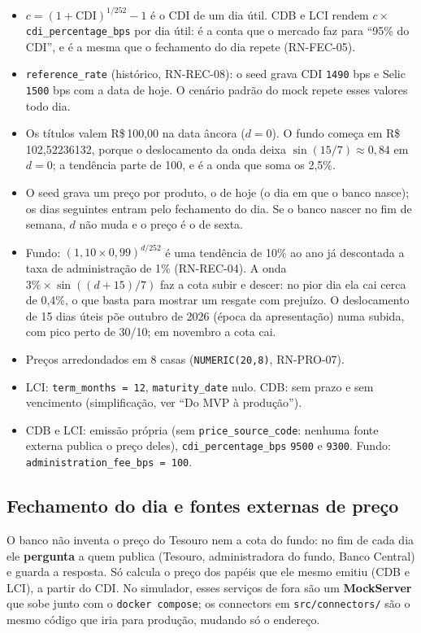 \documentclass[11pt,a4paper]{article}
\newcommand{\rs}{R\$\,}
\newcommand{\tb}[1]{\texttt{#1}}           %
\begin{document}
\begin{itemize}
  \item $c = (1 + \text{CDI})^{1/252} - 1$ é o CDI de um dia útil. CDB e LCI rendem
        $c \times$ \tb{cdi_percentage_bps} por dia útil: é a conta que o mercado faz para
        ``95\% do CDI'', e é a mesma que o fechamento do dia repete (RN-FEC-05).
  \item \tb{reference_rate} (histórico, RN-REC-08): o seed grava CDI \tb{1490} bps e Selic
        \tb{1500} bps com a data de hoje. O cenário padrão do mock repete esses valores todo dia.
  \item Os títulos valem \rs 100,00 na data âncora ($d = 0$). O fundo começa em
        \rs 102,52236132, porque o deslocamento da onda deixa $\sin(15/7) \approx 0{,}84$ em $d = 0$;
        a tendência parte de 100, e é a onda que soma os 2,5\%.
  \item O seed grava um preço por produto, o de hoje (o dia em que o banco nasce); os dias
        seguintes entram pelo fechamento do dia. Se o banco nascer no fim de semana, $d$ não muda
        e o preço é o de sexta.
  \item Fundo: $(1{,}10 \times 0{,}99)^{d/252}$ é uma tendência de 10\% ao ano já descontada a
        taxa de administração de 1\% (RN-REC-04). A onda $3\% \times \sin((d + 15)/7)$ faz a cota
        subir e descer: no pior dia ela cai cerca de 0,4\%, o que basta para mostrar um resgate
        com prejuízo. O deslocamento de 15 dias úteis põe outubro de 2026 (época da
        apresentação) numa subida, com pico perto de 30/10; em novembro a cota cai.
  \item Preços arredondados em 8 casas (\tb{NUMERIC(20,8)}, RN-PRO-07).
  \item LCI: \tb{term_months = 12}, \tb{maturity_date} nulo. CDB: sem
        prazo e sem vencimento (simplificação, ver ``Do MVP à produção'').
  \item CDB e LCI: emissão própria (sem \tb{price_source_code}: nenhuma fonte externa publica o preço
        deles), \tb{cdi_percentage_bps} \tb{9500} e \tb{9300}. Fundo: \tb{administration_fee_bps = 100}.
\end{itemize}

\subsection{Fechamento do dia e fontes externas de preço}\label{sec:fechamento}

O banco não inventa o preço do Tesouro nem a cota do fundo: no fim de cada dia ele
\textbf{pergunta} a quem publica (Tesouro, administradora do fundo, Banco Central) e guarda a
resposta. Só calcula o preço dos papéis que ele mesmo emitiu (CDB e LCI), a partir do CDI. No
simulador, esses serviços de fora são um \textbf{MockServer} que sobe junto com o
\tb{docker compose}; os connectors em \tb{src/connectors/} são o mesmo código que iria para
produção, mudando só o endereço.
\end{document}
